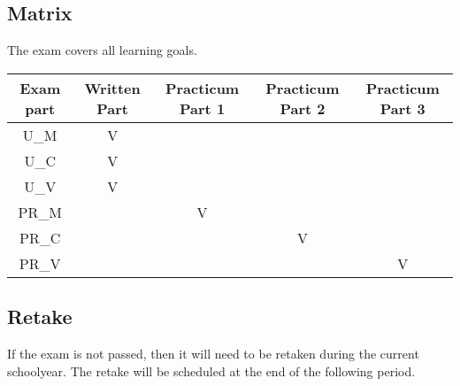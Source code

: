 \subsection*{Matrix}
The exam covers all learning goals.
\begin{center}
\begin{tabular}{ |c|c|c|c|c| } 
\hline 
Exam part & Written Part & Practicum Part 1 & Practicum Part 2  & Practicum Part 3 \\
\hline
U\_M  & V & &&\\
U\_C  & V& &&\\
U\_V  & V &&\\
PR\_M  && V &&\\
PR\_C  & &&V& \\
PR\_V & && & V \\
\hline
\end{tabular}
\end{center}

\subsection{Retake}
 If the exam is not passed, then it will need to be retaken during the current schoolyear.
The retake will be scheduled at the end of the following period.



	
